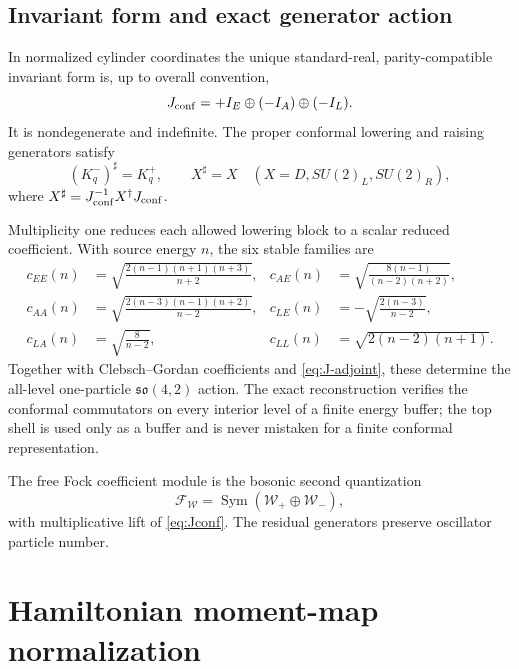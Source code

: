 \documentclass[11pt]{article}
\theoremstyle{definition}
\theoremstyle{remark}
\newcommand{\W}{\mathcal W}
\newcommand{\F}{\mathcal F}
\begin{document}
\subsection{Invariant form and exact generator action}

In normalized cylinder coordinates the unique standard-real,
parity-compatible invariant form is, up to overall convention,
\begin{equation}\label{eq:Jconf}
 J_{\rm conf}=+I_E\oplus(-I_A)\oplus(-I_L).
\end{equation}
It is nondegenerate and indefinite.  The proper conformal lowering and
raising generators satisfy
\begin{equation}\label{eq:J-adjoint}
 (K^-_q)^\sharp=K^+_q,
 \qquad X^\sharp=X\quad(X=D,SU(2)_L,SU(2)_R),
\end{equation}
where $X^\sharp=J_{\rm conf}^{-1}X^\dagger J_{\rm conf}$.

Multiplicity one reduces each allowed lowering block to a scalar reduced
coefficient.  With source energy $n$, the six stable families are
\begin{align}
 c_{EE}(n)&=\sqrt{\frac{2(n-1)(n+1)(n+3)}{n+2}},
 &c_{AE}(n)&=\sqrt{\frac{8(n-1)}{(n-2)(n+2)}},\nonumber\\
 c_{AA}(n)&=\sqrt{\frac{2(n-3)(n-1)(n+2)}{n-2}},
 &c_{LE}(n)&=-\sqrt{\frac{2(n-3)}{n-2}},\label{eq:reduced-coefficients}\\
 c_{LA}(n)&=\sqrt{\frac8{n-2}},
 &c_{LL}(n)&=\sqrt{2(n-2)(n+1)}.\nonumber
\end{align}
Together with Clebsch--Gordan coefficients and \eqref{eq:J-adjoint}, these
determine the all-level one-particle $\mathfrak{so}(4,2)$ action.
The exact reconstruction verifies the conformal commutators on every
interior level of a finite energy buffer; the top shell is used only as a
buffer and is never mistaken for a finite conformal representation.

The free Fock coefficient module is the bosonic second quantization
\begin{equation}\label{eq:fock-module}
 \F_{\W}=\operatorname{Sym}(\W_+\oplus\W_-),
\end{equation}
with multiplicative lift of \eqref{eq:Jconf}.  The residual generators
preserve oscillator particle number.

\section{Hamiltonian moment-map normalization}\label{sec:moment-map}
\end{document}
